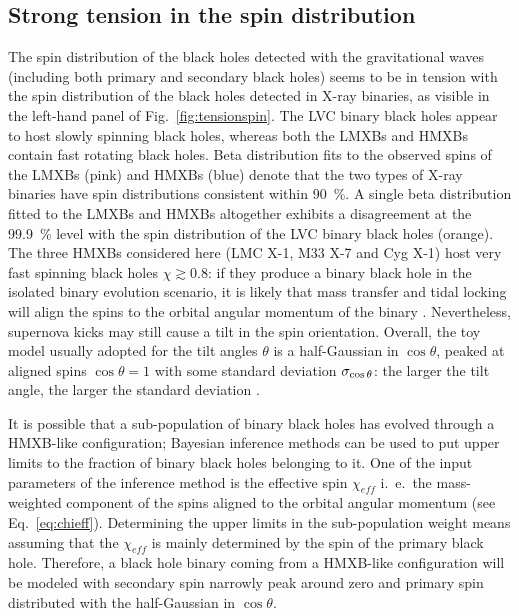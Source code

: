 \documentclass[a4paper,titlepage]{book}     	%
\begin{document}
\subsection{Strong tension in the spin distribution}\label{subsec:tensionspin}
The spin distribution of the black holes detected with the gravitational waves (including both primary and secondary black holes) seems to be in tension with the spin distribution of the black holes detected in X-ray binaries, as visible in the left-hand panel of Fig.\ \ref{fig:tensionspin}. The LVC binary black holes appear to host slowly spinning black holes, whereas both the LMXBs and HMXBs contain fast rotating black holes. Beta distribution fits to the observed spins of the LMXBs (pink) and HMXBs (blue) denote that the two types of X-ray binaries have spin distributions consistent within 90~\%. A single beta distribution fitted to the LMXBs and HMXBs altogether exhibits a disagreement at the 99.9~\% level with the spin distribution of the LVC binary black holes (orange).\cite{HMXBH_spins2021}\\

The three HMXBs considered here (LMC X-1, M33 X-7 and Cyg X-1) host very fast spinning black holes $\chi \gtrsim 0.8$: if they produce a binary black hole in the isolated binary evolution scenario, it is likely that mass transfer and tidal locking will align the spins to the orbital angular momentum of the binary \cite{Kalogera2000_spinaligned}. Nevertheless, supernova kicks may still cause a tilt in the spin orientation. Overall, the toy model usually adopted for the tilt angles $\theta$ is a half-Gaussian in $\cos \theta$, peaked at aligned spins $\cos \theta = 1$  with some standard deviation $\sigma_{\rm \cos \theta}$: the larger the tilt angle, the larger the standard deviation \cite{spintiltmodel_Talbot2017}. %

It is possible that a sub-population of binary black holes has evolved through a HMXB-like configuration; Bayesian inference methods can be used to put upper limits to the fraction of binary black holes belonging to it. One of the input parameters of the inference method is the effective spin $\chi_{eff}$ i.\ e.\ the mass-weighted component of the spins aligned to the orbital angular momentum (see Eq.\ \ref{eq:chieff}). Determining the upper limits in the sub-population weight means assuming that the $\chi_{eff}$ is mainly determined by the spin of the primary black hole. Therefore, a black hole binary coming from a HMXB-like configuration will be modeled with secondary spin narrowly peak around zero and primary spin distributed with the half-Gaussian in $\cos \theta$. 
\end{document}
